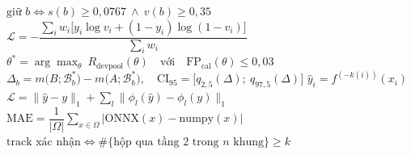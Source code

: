 \documentclass[border=1.5pt,multi=eqn]{standalone}
\newenvironment{eqn}[1]{\fontsize{18}{22}\selectfont\color[HTML]{#1}$\displaystyle}{$}
\begin{document}
\begin{eqn}{0E2238}\text{giữ } b\iff s(b)\ge 0{,}0767\ \wedge\ v(b)\ge 0{,}35\end{eqn}
\begin{eqn}{0E2238}\mathcal{L}=-\dfrac{\sum_i w_i\bigl[y_i\log v_i+(1-y_i)\log(1-v_i)\bigr]}{\sum_i w_i}\end{eqn}
\begin{eqn}{0E2238}\theta^{*}=\arg\max_{\theta}\ R_{\text{devpool}}(\theta)\quad\text{với}\quad \mathrm{FP}_{\text{cal}}(\theta)\le 0{,}03\end{eqn}
\begin{eqn}{0E2238}\Delta_b=m\bigl(B;\mathcal{B}^{*}_{b}\bigr)-m\bigl(A;\mathcal{B}^{*}_{b}\bigr),\quad \mathrm{CI}_{95}=\bigl[q_{2{,}5}(\Delta);\ q_{97{,}5}(\Delta)\bigr]\end{eqn}
\begin{eqn}{0E2238}\hat y_i=f^{(-k(i))}(x_i)\end{eqn}
\begin{eqn}{0E2238}\mathcal{L}=\bigl\|\hat y-y\bigr\|_{1}+\sum_{l}\bigl\|\phi_l(\hat y)-\phi_l(y)\bigr\|_{1}\end{eqn}
\begin{eqn}{0E2238}\mathrm{MAE}=\dfrac{1}{|\Omega|}\sum_{x\in\Omega}\bigl|\mathrm{ONNX}(x)-\mathrm{numpy}(x)\bigr|\end{eqn}
\begin{eqn}{0E2238}\text{track xác nhận}\iff\#\{\text{hộp qua tầng 2 trong }n\text{ khung}\}\ge k\end{eqn}
\end{document}
